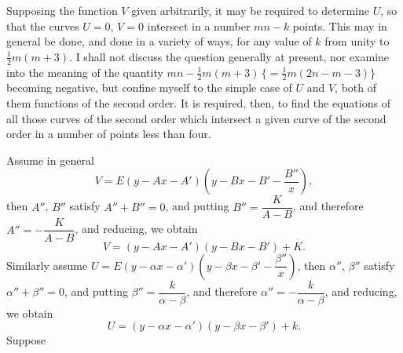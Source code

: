 \documentclass[11pt]{article}
\begin{document}
Supposing the function $V$ given arbitrarily, it may be required to determine $U$, so that the curves $U = 0$, $V = 0$ intersect in a number $mn - k$ points. This may in general be done, and done in a variety of ways, for any value of $k$ from unity to $\tfrac12 m(m + 3)$. I shall not discuss the question generally at present, nor examine into the meaning of the quantity $mn - \tfrac12 m(m + 3)\,\{= \tfrac12 m(2n - m - 3)\}$ becoming negative, but confine myself to the simple case of $U$ and $V$, both of them functions of the second order. It is required, then, to find the equations of all those curves of the second order which intersect a given curve of the second order in a number of points less than four.

Assume in general
\[
V = E(y - A x - A')\!\left(y - B x - B' - \frac{B''}{x}\right),
\]
then $A''$, $B''$ satisfy $A'' + B'' = 0$, and putting $B'' = \dfrac{K}{A - B}$, and therefore $A'' = -\dfrac{K}{A - B}$, and reducing, we obtain
\[
V = (y - A x - A')(y - B x - B') + K.
\]
Similarly assume $U = E(y - \alpha x - \alpha')\!\left(y - \beta x - \beta' - \dfrac{\beta''}{x}\right)$,
then $\alpha''$, $\beta''$ satisfy $\alpha'' + \beta'' = 0$, and putting $\beta'' = \dfrac{k}{\alpha - \beta}$, and therefore $\alpha'' = -\dfrac{k}{\alpha - \beta}$, and reducing, we obtain
\[
U = (y - \alpha x - \alpha')(y - \beta x - \beta') + k.
\]
Suppose
\end{document}
